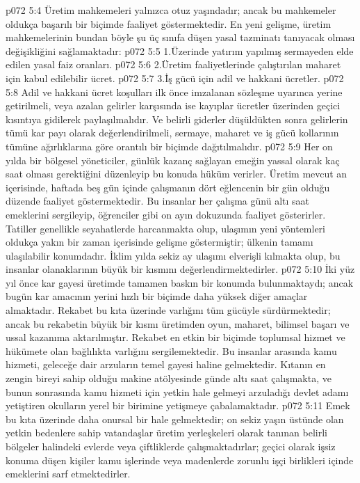 \vs p072 5:4 Üretim mahkemeleri yalnızca otuz yaşındadır; ancak bu mahkemeler oldukça başarılı bir biçimde faaliyet göstermektedir. En yeni gelişme, üretim mahkemelerinin bundan böyle şu üç sınıfa düşen yasal tazminatı tanıyacak olması değişikliğini sağlamaktadır:
\vs p072 5:5 1.\bibnobreakspace Üzerinde yatırım yapılmış sermayeden elde edilen yasal faiz oranları.
\vs p072 5:6 2.\bibnobreakspace Üretim faaliyetlerinde çalıştırılan maharet için kabul edilebilir ücret.
\vs p072 5:7 3.\bibnobreakspace İş gücü için adil ve hakkani ücretler.
\vs p072 5:8 Adil ve hakkani ücret koşulları ilk önce imzalanan sözleşme uyarınca yerine getirilmeli, veya azalan gelirler karşısında ise kayıplar ücretler üzerinden geçici kısıntıya gidilerek paylaşılmalıdır. Ve belirli giderler düşüldükten sonra gelirlerin tümü kar payı olarak değerlendirilmeli, sermaye, maharet ve iş gücü kollarının tümüne ağırlıklarına göre orantılı bir biçimde dağıtılmalıdır.
\vs p072 5:9 Her on yılda bir bölgesel yöneticiler, günlük kazanç sağlayan emeğin yassal olarak kaç saat olması gerektiğini düzenleyip bu konuda hüküm verirler. Üretim mevcut an içerisinde, haftada beş gün içinde çalışmanın dört eğlencenin bir gün olduğu düzende faaliyet göstermektedir. Bu insanlar her çalışma günü altı saat emeklerini sergileyip, öğrenciler gibi on ayın dokuzunda faaliyet gösterirler. Tatiller genellikle seyahatlerde harcanmakta olup, ulaşımın yeni yöntemleri oldukça yakın bir zaman içerisinde gelişme göstermiştir; ülkenin tamamı ulaşılabilir konumdadır. İklim yılda sekiz ay ulaşımı elverişli kılmakta olup, bu insanlar olanaklarının büyük bir kısmını değerlendirmektedirler.
\vs p072 5:10 İki yüz yıl önce kar gayesi üretimde tamamen baskın bir konumda bulunmaktaydı; ancak bugün kar amacının yerini hızlı bir biçimde daha yüksek diğer amaçlar almaktadır. Rekabet bu kıta üzerinde varlığını tüm gücüyle sürdürmektedir; ancak bu rekabetin büyük bir kısmı üretimden oyun, maharet, bilimsel başarı ve ussal kazanıma aktarılmıştır. Rekabet en etkin bir biçimde toplumsal hizmet ve hükümete olan bağlılıkta varlığını sergilemektedir. Bu insanlar arasında kamu hizmeti, geleceğe dair arzuların temel gayesi haline gelmektedir. Kıtanın en zengin bireyi sahip olduğu makine atölyesinde günde altı saat çalışmakta, ve bunun sonrasında kamu hizmeti için yetkin hale gelmeyi arzuladığı devlet adamı yetiştiren okulların yerel bir birimine yetişmeye çabalamaktadır.
\vs p072 5:11 Emek bu kıta üzerinde daha onursal bir hale gelmektedir; on sekiz yaşın üstünde olan yetkin bedenlere sahip vatandaşlar üretim yerleşkeleri olarak tanınan belirli bölgeler halindeki evlerde veya çiftliklerde çalışmaktadırlar; geçici olarak işsiz konuma düşen kişiler kamu işlerinde veya madenlerde zorunlu işçi birlikleri içinde emeklerini sarf etmektedirler.
